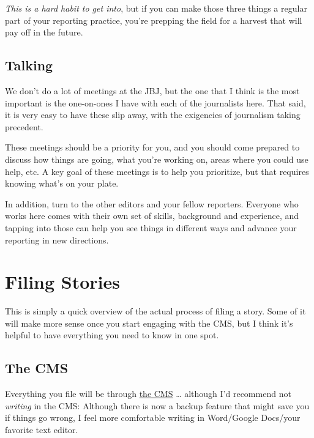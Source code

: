\documentclass[
  12pt,
  american,
  letterpaperpaper,
  extrafontsizes,onecolumn,openright
  ]{memoir}
\begin{document}
\emph{This is a hard habit to get into}, but if you can make those three things a regular part of your reporting practice, you're prepping the field for a harvest that will pay off in the future.

\hypertarget{talking}{%
\section*{Talking}\label{talking}}

We don't do a lot of meetings at the JBJ, but the one that I think is the most important is the one-on-ones I have with each of the journalists here. That said, it is very easy to have these slip away, with the exigencies of journalism taking precedent.

These meetings should be a priority for you, and you should come prepared to discuss how things are going, what you're working on, areas where you could use help, etc. A key goal of these meetings is to help you prioritize, but that requires knowing what's on your plate.

In addition, turn to the other editors and your fellow reporters. Everyone who works here comes with their own set of skills, background and experience, and tapping into those can help you see things in different ways and advance your reporting in new directions.

\hypertarget{filing-stories}{%
\chapter{Filing Stories}\label{filing-stories}}

This is simply a quick overview of the actual process of filing a story. Some of it will make more sense once you start engaging with the CMS, but I think it's helpful to have everything you need to know in one spot.

\hypertarget{the-cms}{%
\section*{The CMS}\label{the-cms}}

Everything you file will be through \href{https://cms.bizj.us/}{the CMS} \ldots{} although I'd recommend not \emph{writing} in the CMS: Although there is now a backup feature that might save you if things go wrong, I feel more comfortable writing in Word/Google Docs/your favorite text editor.
\end{document}
